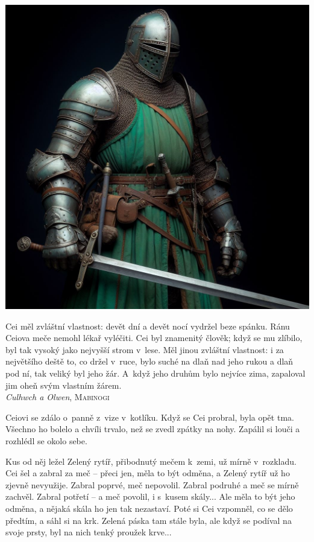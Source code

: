 \documentclass[a4paper,twocolumn,openany,nodeprecatedcode, justified]{dndbook}
\begin{document}
	\noindent
	\includegraphics[width=\linewidth]{GreenKnightPlain.jpg}
	
	\vspace{2\baselineskip}
	
	\begin{DndReadAloud}
		\sffamily
		\raggedright
		Cei měl zvláštní vlastnost: devět dní a devět nocí vydržel beze spánku. Ránu Ceiova meče nemohl lékař vyléčiti. Cei byl znamenitý člověk; když se mu zlíbilo, byl tak vysoký jako nejvyšší strom v~lese. Měl jinou zvláštní vlastnost: i za největšího deště to, co držel v~ruce, bylo suché na dlaň nad jeho rukou a dlaň pod ní, tak veliký byl jeho žár. A~když jeho druhům bylo nejvíce zima, zapaloval jim oheň svým vlastním žárem.\\
		\raggedleft \emph{Culhwch a Olwen}, \textsc{Mabinogi}
	\end{DndReadAloud}
	
	Ceiovi se zdálo o~panně z~vize v~kotlíku. Když se Cei probral, byla opět tma. Všechno ho bolelo a chvíli trvalo, než se zvedl zpátky na nohy. Zapálil si louči a rozhlédl se okolo sebe.
	
	Kus od něj ležel Zelený rytíř, přibodnutý mečem k~zemi, už mírně v~rozkladu. Cei šel a zabral za meč -- přeci jen, měla to být odměna, a Zelený rytíř už ho zjevně nevyužije. Zabral poprvé, meč nepovolil. Zabral podruhé a meč se mírně zachvěl. Zabral potřetí -- a meč povolil, i s~kusem skály... Ale měla to být jeho odměna, a nějaká skála ho jen tak nezastaví. Poté si Cei vzpomněl, co se dělo předtím, a sáhl si na krk. Zelená páska tam stále byla, ale když se podíval na svoje prsty, byl na nich tenký proužek krve...
	
\end{document}
